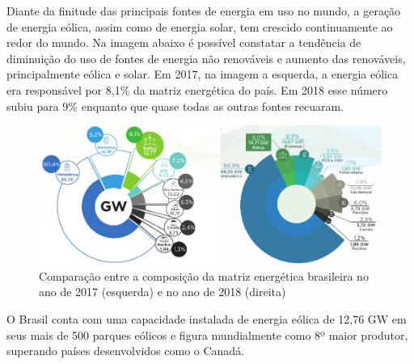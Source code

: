 \documentclass[
	12pt,				%
	openright,			%
	oneside,			%
	a4paper,			%
	english,			%
	french,				%
	spanish,			%
	brazil				%
	]{abntex2}
\begin{document}
Diante da finitude das principais fontes de energia em uso no mundo, a geração de energia eólica, assim como de energia solar, tem crescido continuamente ao redor do mundo. Na imagem abaixo é possível constatar a tendência de diminuição do uso de fontes de energia não renováveis e aumento das renováveis, principalmente eólica e solar. Em 2017, na imagem a esquerda, a energia eólica era responsável por 8,1\% da matriz energética do país. Em 2018 esse número subiu para 9\% enquanto que quase todas as outras fontes recuaram.

\begin{figure}[h]
    \centering
	\includegraphics[width=\textwidth]{abe_2017_2018}
	\caption{Comparação entre a composição da matriz energética brasileira no ano de 2017 (esquerda) e no ano de 2018 (direita)}
\end{figure}
\FloatBarrier

O Brasil conta com uma capacidade instalada de energia eólica de 12,76 GW em seus mais de 500 parques eólicos e figura mundialmente como 8º maior produtor, superando países desenvolvidos como o Canadá.
\end{document}
